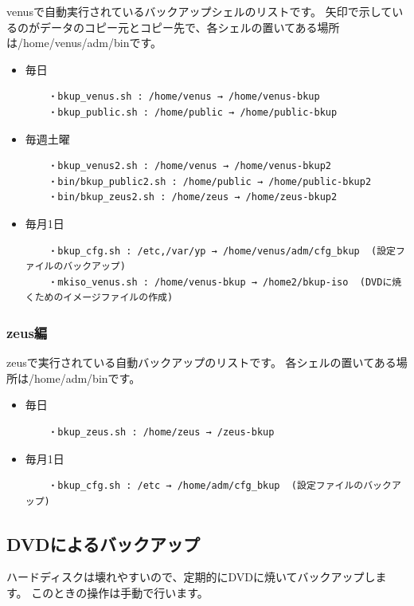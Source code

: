 \documentclass[11pt]{jarticle}
\begin{document}
venusで自動実行されているバックアップシェルのリストです。
矢印で示しているのがデータのコピー元とコピー先で、各シェルの置いてある場所は/home/venus/adm/binです。


\begin{itemize}
\item 毎日
\begin{verbatim}
	・bkup_venus.sh : /home/venus → /home/venus-bkup
	・bkup_public.sh : /home/public → /home/public-bkup
\end{verbatim}
\item 毎週土曜
      \begin{verbatim}
	・bkup_venus2.sh : /home/venus → /home/venus-bkup2
	・bin/bkup_public2.sh : /home/public → /home/public-bkup2
	・bin/bkup_zeus2.sh : /home/zeus → /home/zeus-bkup2
      \end{verbatim}
\item 毎月1日
      \begin{verbatim}
	・bkup_cfg.sh : /etc,/var/yp → /home/venus/adm/cfg_bkup  (設定ファイルのバックアップ)
	・mkiso_venus.sh : /home/venus-bkup → /home2/bkup-iso  (DVDに焼くためのイメージファイルの作成)
      \end{verbatim}
\end{itemize}


\subsubsection{zeus編}

zeusで実行されている自動バックアップのリストです。
各シェルの置いてある場所は/home/adm/binです。
\begin{itemize}
\item 毎日
\begin{verbatim}
	・bkup_zeus.sh : /home/zeus → /zeus-bkup
\end{verbatim}
\item 毎月1日
      \begin{verbatim}
	・bkup_cfg.sh : /etc → /home/adm/cfg_bkup  (設定ファイルのバックアップ)
      \end{verbatim}
\end{itemize}






\subsection{DVDによるバックアップ}

ハードディスクは壊れやすいので、定期的にDVDに焼いてバックアップします。
このときの操作は手動で行います。
\\
\end{document}
